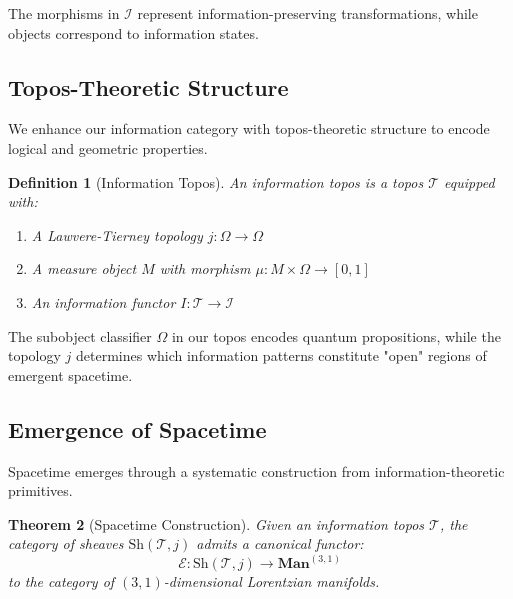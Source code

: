 \documentclass[12pt,a4paper]{article}
\newtheorem{theorem}{Theorem}[section]
\newtheorem{definition}[theorem]{Definition}
\begin{document}
The morphisms in $\mathcal{I}$ represent information-preserving transformations, while objects correspond to information states.

\subsection{Topos-Theoretic Structure}

We enhance our information category with topos-theoretic structure to encode logical and geometric properties.

\begin{definition}[Information Topos]
An \emph{information topos} is a topos $\mathcal{T}$ equipped with:
\begin{enumerate}
\item A Lawvere-Tierney topology $j: \Omega \to \Omega$
\item A measure object $M$ with morphism $\mu: M \times \Omega \to [0,1]$
\item An information functor $I: \mathcal{T} \to \mathcal{I}$
\end{enumerate}
\end{definition}

The subobject classifier $\Omega$ in our topos encodes quantum propositions, while the topology $j$ determines which information patterns constitute "open" regions of emergent spacetime.

\subsection{Emergence of Spacetime}

Spacetime emerges through a systematic construction from information-theoretic primitives.

\begin{theorem}[Spacetime Construction]
Given an information topos $\mathcal{T}$, the category of sheaves $\text{Sh}(\mathcal{T}, j)$ admits a canonical functor:
\begin{equation}
\mathcal{E}: \text{Sh}(\mathcal{T}, j) \to \mathbf{Man}^{(3,1)}
\end{equation}
to the category of $(3,1)$-dimensional Lorentzian manifolds.
\end{theorem}
\end{document}
